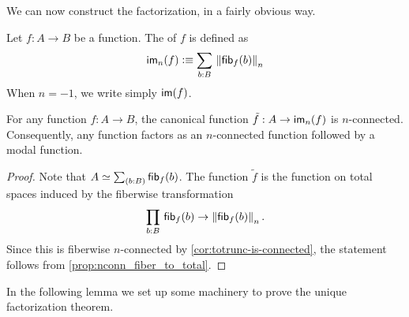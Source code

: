 

We can now construct the factorization, in a fairly obvious way.

\begin{defn}\label{defn:modal-image}
Let $f:A\to B$ be a function. The  of $f$ is defined as
\begin{equation*}
\im_n(f)\defeq \sm{b:B} \trunc n{\hfib{f}b}
\end{equation*}
When $n=-1$, we write simply $\mathsf{im}(f)$.
\end{defn}

\begin{lem}\label{prop:to_image_is_connected}
For any function $f:A\to B$, the canonical function $\tilde{f}:A\to\mathsf{im}_n(f)$ is $n$-connected. 
Consequently, any function factors as an $n$-connected function followed by a modal function.
\end{lem}

\begin{proof}
Note that $A\simeq\sm{b:B}\hfib{f}b$. The function $\tilde{f}$ is the function on total spaces induced by the fiberwise
transformation
\begin{equation*}
\prd{b:B} \hfib{f}b\to\trunc n{\hfib{f}b}.
\end{equation*}
Since this is fiberwise $n$-connected by \autoref{cor:totrunc-is-connected}, the statement follows from
\autoref{prop:nconn_fiber_to_total}.
\end{proof}

In the following lemma we set up some machinery to prove the unique factorization theorem.

